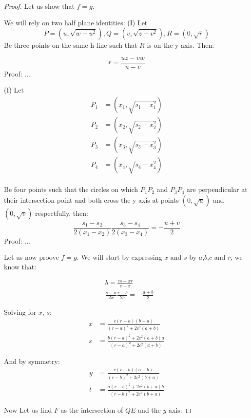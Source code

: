 \documentclass[a4paper,10pt]{article}
\begin{document}
\begin{proof}
Let us show that $f = g$.

\noindent
We will rely on two half plane identities:
(I) Let
\[
P=\left(u, \sqrt{w - u^2}\right),Q=\left(v, \sqrt{z - v^2}\right),R=\left(0, \sqrt{r}\right)
\]
Be three points on the same h-line such that $R$ is on the y-axis. Then:

\[
  r = \frac{uz - vw}{u - v}
\]
Proof:
...

(I) Let
\begin{align*}
P_1 &= \left(x_1, \sqrt{s_1 - x_1^2}\right)\\
P_2 &= \left(x_2, \sqrt{s_2 - x_2^2}\right)\\
P_3 &= \left(x_3, \sqrt{s_3 - x_3^2}\right)\\
P_4 &= \left(x_4, \sqrt{s_4 - x_4^2}\right)\\
\end{align*}

Be four points such that the circles on which $P_1P_2$ and $P_3P_4$
are perpendicular at their intersection point and both cross the y 
axis at points $(0,\sqrt{u})$ and $(0,\sqrt{v})$ respectfully, then:
\[
\frac{s_1 - s_2}{2\left(x_1 - x_2\right)} \frac{s_3 - s_4}{2\left(x_3 - x_4\right)} = -\frac{u+v}{2}
\]
Proof:
...

Let us now proove $f=g$.
We will start by expressing $x$ and $s$ by $a$,$b$,$c$ and $r$, we know that:

\begin{align*}
&b = \frac{cs - xr}{c - x} \\
&\frac{s - a}{2x} \frac{r - b}{2c} = -\frac{a+b}{2}
\end{align*}

Solving for $x$, $s$:
\begin{align*}
x &= \frac{c\left(r - a\right)\left(b - a\right)}{\left(r - a\right)^2 + 2c^2\left(a + b\right)}\\
s &= \frac{b\left(r - a\right)^2 + 2c^2\left(a + b\right)a}{\left(r - a\right)^2 + 2c^2\left(a + b\right)}
\end{align*}

And by symmetry:
\begin{align*}
y &= \frac{c\left(r - b\right)\left(a - b\right)}{\left(r - b\right)^2 + 2c^2\left(b + a\right)}\\
t &= \frac{a\left(r - b\right)^2 + 2c^2\left(b + a\right)b}{\left(r - b\right)^2 + 2c^2\left(b + a\right)}
\end{align*}

Now Let us find $F$ as the intersection of $QE$ and the $y$ axis:


\end{proof}
\end{document}
